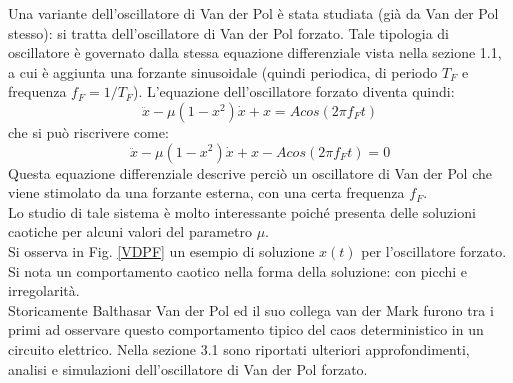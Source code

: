 \documentclass[12pt]{article}
\begin{document}
Una variante dell'oscillatore di Van der Pol è stata studiata (già da Van der Pol stesso): si tratta dell'oscillatore di Van der Pol forzato.
Tale tipologia di oscillatore è governato dalla stessa equazione differenziale vista nella sezione 1.1, a cui è aggiunta una forzante sinusoidale (quindi periodica, di periodo $T_F$ e frequenza $f_F = 1/T_F$).
L'equazione dell'oscillatore forzato diventa quindi:
$$
\ddot{x} - \mu(1-x^2)\dot{x} + x = Acos(2\pi f_F t)
$$
che si può riscrivere come:
\begin{equation}
	\label{EqForced}
	\ddot{x} - \mu(1-x^2)\dot{x} + x - Acos(2\pi f_F t) = 0
\end{equation}
Questa equazione differenziale descrive perciò un oscillatore di Van der Pol che viene stimolato da una forzante esterna, con una certa frequenza $f_F$. \\
Lo studio di tale sistema è molto interessante poiché presenta delle soluzioni caotiche per alcuni valori del parametro $\mu$. \\
Si osserva in Fig. \ref{VDPF} un esempio di soluzione $x(t)$ per l'oscillatore forzato. Si nota un comportamento caotico nella forma della soluzione: con picchi e irregolarità.\\
Storicamente Balthasar Van der Pol ed il suo collega van der Mark furono tra i primi ad osservare questo comportamento tipico del caos deterministico in un circuito elettrico.
Nella sezione 3.1 sono riportati ulteriori approfondimenti, analisi e simulazioni dell'oscillatore di Van der Pol forzato.
\end{document}
